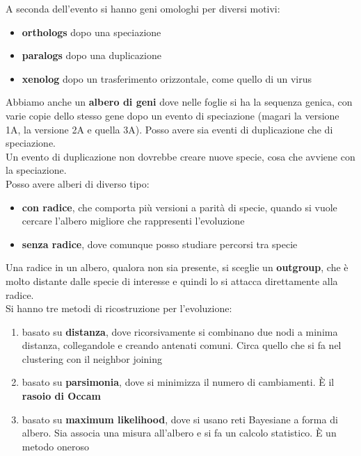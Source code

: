 \documentclass[a4paper,12pt, oneside]{book}
\begin{document}
A seconda dell'evento si hanno geni omologhi per diversi motivi:
\begin{itemize}
  \item \textbf{orthologs} dopo una speciazione
  \item \textbf{paralogs} dopo una duplicazione
  \item \textbf{xenolog} dopo un trasferimento orizzontale, come quello di un
  virus 
\end{itemize}
Abbiamo anche un \textbf{albero di geni} dove nelle foglie si ha la sequenza
genica, con varie copie dello stesso gene dopo un evento di speciazione (magari
la versione 1A, la versione 2A e quella 3A). Posso avere sia eventi di
duplicazione che di speciazione. \\
Un evento di duplicazione non dovrebbe creare nuove specie, cosa che avviene con
la speciazione.\\
Posso avere alberi di diverso tipo:
\begin{itemize}
  \item \textbf{con radice}, che comporta più versioni a parità di specie,
  quando si vuole cercare l'albero migliore che rappresenti l'evoluzione
  \item \textbf{senza radice}, dove comunque posso studiare percorsi tra specie
\end{itemize}
Una radice in un albero, qualora non sia presente, si sceglie un
\textbf{outgroup}, che è molto distante dalle specie di interesse e quindi lo si
attacca direttamente alla radice.\\
Si hanno tre metodi di ricostruzione per l'evoluzione:
\begin{enumerate}
  \item basato su \textbf{distanza}, dove ricorsivamente si combinano due nodi a
  minima distanza, collegandole e creando antenati comuni. Circa quello che si
  fa nel clustering con il neighbor joining
  \item basato su \textbf{parsimonia}, dove si minimizza il numero di
  cambiamenti. È il \textbf{rasoio di Occam}
  \item basato su \textbf{maximum likelihood}, dove si usano reti Bayesiane a
  forma di albero. Sia associa una misura all'albero e si fa un calcolo
  statistico. È un metodo oneroso
\end{enumerate}
\end{document}
